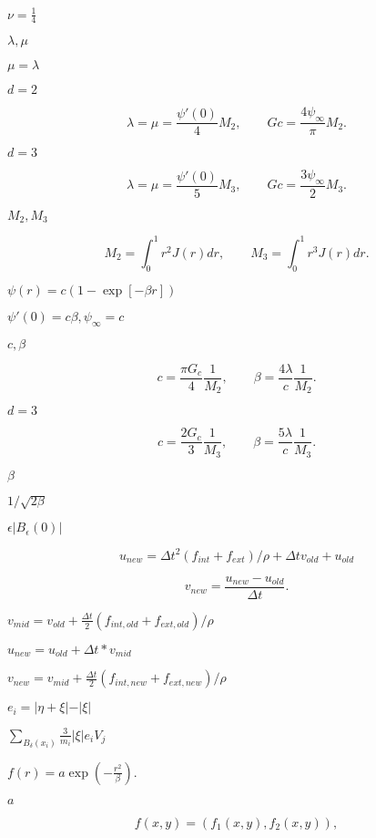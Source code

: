 \documentclass{article}
\begin{document}
$ \nu = \frac{1}{4} $
\pagebreak

$ \lambda, \mu $
\pagebreak

$ \mu = \lambda $
\pagebreak

$ d=2 $
\pagebreak

\[ \lambda = \mu = \frac{\psi'(0)}{4} M_2, \qquad Gc = \frac{4 \psi_{\infty}}{\pi} M_2. \]
\pagebreak

$ d=3$
\pagebreak

\[ \lambda = \mu = \frac{\psi'(0)}{5} M_3, \qquad Gc = \frac{3 \psi_{\infty}}{2} M_3. \]
\pagebreak

$M_2, M_3$
\pagebreak

\[ M_2 =\int_0^1 r^2 J(r) dr, \qquad M_3 = \int_0^1 r^3 J(r) dr. \]
\pagebreak

$ \psi(r) = c ( 1-\exp[-\beta r])$
\pagebreak

$ \psi'(0) = c\beta, \psi_{\infty} = c $
\pagebreak

$ c, \beta $
\pagebreak

\[ c = \frac{\pi G_c}{4} \frac{1}{M_2}, \qquad \beta = \frac{4 \lambda}{c} \frac{1}{M_2} .\]
\pagebreak

$ d=3 $
\pagebreak

\[ c = \frac{2 G_c}{3} \frac{1}{M_3}, \qquad \beta = \frac{5 \lambda}{c} \frac{1}{M_3} .\]
\pagebreak

$ \beta $
\pagebreak

$ 1/\sqrt{2\beta}$
\pagebreak

$ \epsilon |B_\epsilon(0)|$
\pagebreak

\[ u_{new} = \Delta t^2 (f_{int} + f_{ext}) / \rho + \Delta t v_{old} + u_{old} \]
\pagebreak

\[ v_{new} = \frac{u_{new} - u_{old}}{\Delta t}. \]
\pagebreak

$ v_{mid} = v_{old} + \frac{\Delta t}{2} (f_{int,old} + f_{ext, old}) / \rho $
\pagebreak

$ u_{new} = u_{old} + \Delta t * v_{mid} $
\pagebreak

$ v_{new} = v_{mid} + \frac{\Delta t}{2} (f_{int,new} + f_{ext, new}) / \rho $
\pagebreak

$ e_i = \vert \eta + \xi \vert - \vert \xi \vert $
\pagebreak

$ \sum\limits_{B_\delta(x_i)} \frac{3}{m_i} \vert \xi \vert e_i V_j $
\pagebreak

$ f(r) = a \exp(-\frac{r^2}{\beta}). $
\pagebreak

$ a$
\pagebreak

\[ f(x,y) = (f_1(x,y), f_2(x,y)), \]
\pagebreak
\end{document}
